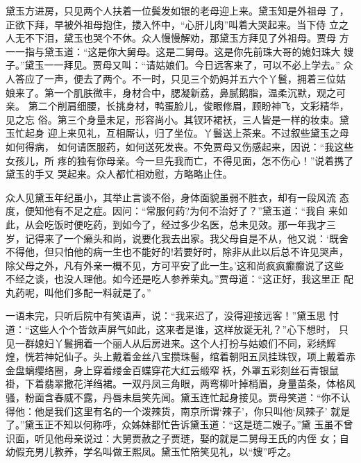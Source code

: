 黛玉方进房，只见两个人扶着一位鬓发如银的老母迎上来。黛玉知是外祖母
了，正欲下拜，早被外祖母抱住，搂入怀中，“心肝儿肉”叫着大哭起来。当下侍
立之人无不下泪，黛玉也哭个不休。众人慢慢解劝，那黛玉方拜见了外祖母。贾母
方一一指与黛玉道：“这是你大舅母。这是二舅母。这是你先前珠大哥的媳妇珠大
嫂子。”黛玉一一拜见。贾母又叫：“请姑娘们。今日远客来了，可以不必上学去。”
众人答应了一声，便去了两个。不一时，只见三个奶妈并五六个丫鬟，拥着三位姑
娘来了。第一个肌肤微丰，身材合中，腮凝新荔，鼻腻鹅脂，温柔沉默，观之可亲。
第二个削肩细腰，长挑身材，鸭蛋脸儿，俊眼修眉，顾盼神飞，文彩精华，见之忘
俗。第三个身量未足，形容尚小。其钗环裙袄，三人皆是一样的妆束。黛玉忙起身
迎上来见礼，互相厮认，归了坐位。丫鬟送上茶来。不过叙些黛玉之母如何得病，
如何请医服药，如何送死发丧。不免贾母又伤感起来，因说：“我这些女孩儿，所
疼的独有你母亲。今一旦先我而亡，不得见面，怎不伤心！”说着携了黛玉的手又
哭起来。众人都忙相劝慰，方略略止住。

众人见黛玉年纪虽小，其举止言谈不俗，身体面貌虽弱不胜衣，却有一段风流
态度，便知他有不足之症。因问：“常服何药?为何不治好了？”黛玉道：“我自
来如此，从会吃饭时便吃药，到如今了，经过多少名医，总未见效。那一年我才三
岁，记得来了一个癞头和尚，说要化我去出家。我父母自是不从，他又说：‘既舍
不得他，但只怕他的病一生也不能好的!若要好时，除非从此以后总不许见哭声，
除父母之外，凡有外亲一概不见，方可平安了此一生。’这和尚疯疯癫癫说了这些
不经之谈，也没人理他。如今还是吃人参养荣丸。”贾母道：“这正好，我这里正
配丸药呢，叫他们多配一料就是了。”

一语未完，只听后院中有笑语声，说：“我来迟了，没得迎接远客！”黛玉思
忖道：“这些人个个皆敛声屏气如此，这来者是谁，这样放诞无礼？”心下想时，
只见一群媳妇丫鬟拥着一个丽人从后房进来。这个人打扮与姑娘们不同，彩绣辉
煌，恍若神妃仙子。头上戴着金丝八宝攒珠髻，绾着朝阳五凤挂珠钗，项上戴着赤
金盘螭缨络圈，身上穿着缕金百蝶穿花大红云缎窄袄，外罩五彩刻丝石青银鼠
褂，下着翡翠撒花洋绉裙。一双丹凤三角眼，两弯柳叶掉梢眉，身量苗条，体格风
骚，粉面含春威不露，丹唇未启笑先闻。黛玉连忙起身接见。贾母笑道：“你不认
得他：他是我们这里有名的一个泼辣货，南京所谓‘辣子’，你只叫他‘凤辣子’
就是了。”黛玉正不知以何称呼，众姊妹都忙告诉黛玉道：“这是琏二嫂子。”黛
玉虽不曾识面，听见他母亲说过：大舅贾赦之子贾琏，娶的就是二舅母王氏的内侄
女；自幼假充男儿教养，学名叫做王熙凤。黛玉忙陪笑见礼，以“嫂”呼之。

